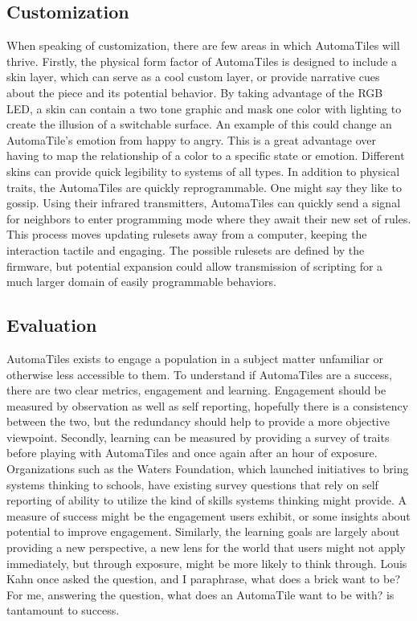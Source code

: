 \subsection{Customization}
When speaking of customization, there are few areas in which AutomaTiles will thrive. Firstly, the physical form factor of AutomaTiles is designed to include a skin layer, which can serve as a cool custom layer, or provide narrative cues about the piece and its potential behavior. By taking advantage of the RGB LED, a skin can contain a two tone graphic and mask one color with lighting to create the illusion of a switchable surface. An example of this could change an AutomaTile’s emotion from happy to angry. This is a great advantage over having to map the relationship of a color to a specific state or emotion. Different skins can provide quick legibility to systems of all types. In addition to physical traits, the AutomaTiles are quickly reprogrammable. One might say they like to gossip. Using their infrared transmitters, AutomaTiles can quickly send a signal for neighbors to enter programming mode where they await their new set of rules. This process moves updating rulesets away from a computer, keeping the interaction tactile and engaging. The possible rulesets are defined by the firmware, but potential expansion could allow transmission of scripting for a much larger domain of easily programmable behaviors.

\subsection{Evaluation}

AutomaTiles exists to engage a population in a subject matter unfamiliar or otherwise less accessible to them. To understand if AutomaTiles are a success, there are two clear metrics, engagement and learning. Engagement should be measured by observation as well as self reporting, hopefully there is a consistency between the two, but the redundancy should help to provide a more objective viewpoint. Secondly, learning can be measured by providing a survey of traits before playing with AutomaTiles and once again after an hour of exposure. Organizations such as the Waters Foundation, which launched initiatives to bring systems thinking to schools, have existing survey questions that rely on self reporting of ability to utilize the kind of skills systems thinking might provide. A measure of success might be the engagement users exhibit, or some insights about potential to improve engagement. Similarly, the learning goals are largely about providing a new perspective, a new lens for the world that users might not apply immediately, but through exposure, might be more likely to think through. Louis Kahn once asked the question, and I paraphrase, what does a brick want to be? For me, answering the question, what does an AutomaTile want to be with? is tantamount to success.

